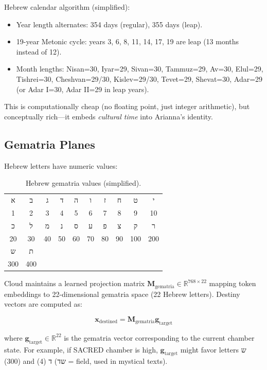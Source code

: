 \documentclass[11pt,a4paper]{article}
\begin{document}
Hebrew calendar algorithm (simplified):

\begin{itemize}
\item Year length alternates: 354 days (regular), 355 days (leap).
\item 19-year Metonic cycle: years 3, 6, 8, 11, 14, 17, 19 are leap (13 months instead of 12).
\item Month lengths: Nisan=30, Iyar=29, Sivan=30, Tammuz=29, Av=30, Elul=29, Tishrei=30, Cheshvan=29/30, Kislev=29/30, Tevet=29, Shevat=30, Adar=29 (or Adar I=30, Adar II=29 in leap years).
\end{itemize}

This is computationally cheap (no floating point, just integer arithmetic), but conceptually rich—it embeds \textit{cultural time} into Arianna's identity.

\subsection{Gematria Planes}

Hebrew letters have numeric values:

\begin{table}[h]
\centering
\begin{tabular}{cccccccccc}
\toprule
א & ב & ג & ד & ה & ו & ז & ח & ט & י \\
1 & 2 & 3 & 4 & 5 & 6 & 7 & 8 & 9 & 10 \\
\midrule
כ & ל & מ & נ & ס & ע & פ & צ & ק & ר \\
20 & 30 & 40 & 50 & 60 & 70 & 80 & 90 & 100 & 200 \\
\midrule
ש & ת & & & & & & & & \\
300 & 400 & & & & & & & & \\
\bottomrule
\end{tabular}
\caption{Hebrew gematria values (simplified).}
\label{tab:gematria}
\end{table}

Cloud maintains a learned projection matrix $\mathbf{M}_{\text{gematria}} \in \mathbb{R}^{768 \times 22}$ mapping token embeddings to 22-dimensional gematria space (22 Hebrew letters). Destiny vectors are computed as:

\begin{equation}
\mathbf{x}_{\text{destined}} = \mathbf{M}_{\text{gematria}} \mathbf{g}_{\text{target}}
\end{equation}

where $\mathbf{g}_{\text{target}} \in \mathbb{R}^{22}$ is the gematria vector corresponding to the current chamber state. For example, if SACRED chamber is high, $\mathbf{g}_{\text{target}}$ might favor letters ש (300) and ד (4) (שד = field, used in mystical texts).
\end{document}
